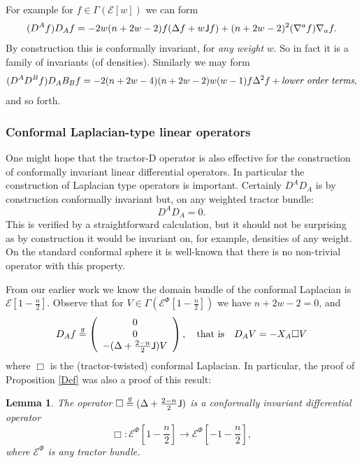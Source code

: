 \documentclass[a4paper,12pt]{amsart}
\def\Cal{\mathcal}
\newcommand{\J}{\mbox{\sf J}}
\newcommand{\ce}{{\Cal E}}
\newtheorem{lemma}[theorem]{Lemma}
\theoremstyle{remark}
\begin{document}
For example for $f\in \Gamma(\ce[w])$ we can form 
$$
(D^A f)D_Af= -2w(n+2w-2)f(\Delta f + w\J f) +(n+2w-2)^2 (\nabla^a f)\nabla_a f.
$$ By construction this is conformally invariant, for {\em any weight}
$w$. So in fact it is a family of invariants (of densities).
Similarly we may form
$$
(D^A D^B f)D_AB_B f= -2(n+2w-4)(n+2w-2)w(w-1) f \Delta^2 f 
+ \mbox{\it{lower order terms}},
$$
and so forth.

\subsubsection{Conformal Laplacian-type linear operators}\label{lap1}

One might hope that the tractor-D operator is also effective for the
construction of conformally invariant linear differential
operators. In particular the construction of Laplacian type operators
is important. Certainly $D^AD_A$ is by construction conformally invariant but, on any weighted tractor bundle:
$$
D^AD_A =0.
$$ 
This is verified by a straightforward calculation, but it should not
be surprising as by construction it would be invariant on, for
example, densities of any weight. On the standard conformal sphere
it is well-known that there is no non-trivial operator with this property. 

From our earlier work we know the domain bundle of the conformal Laplacian is
$\ce[1-\frac{n}{2}]$. Observe that for $V\in
\Gamma(\ce^\Phi[1-\frac{n}{2}])$ we have $n+2w-2=0$, and
$$
D_Af \stackrel{g}{=}\left(\begin{array}{c}
0 \\
0 \\
- (\Delta  + \frac{2-n}{2}\J )V 
\end{array}
\right), \quad\mbox{that is} \quad D_A V= -X_A\Box V
$$
where $\Box$ is the (tractor-twisted) conformal Laplacian. 
In particular, the proof of Proposition \ref{Def} was also a proof of this result:  
\begin{lemma} The operator 
$\Box\stackrel{g}{=}(\Delta  + \frac{2-n}{2}\J )$ is a conformally invariant differential operator 
$$
\Box : \ce^\Phi[1-\frac{n}{2}]\to\ce^\Phi[-1-\frac{n}{2}], 
$$
where $\ce^\Phi$ is any tractor bundle.
\end{lemma}
\end{document}
